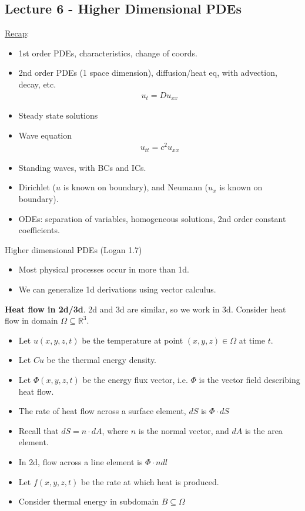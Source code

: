 \documentclass[12pt, letterpaper]{article}
\begin{document}
\subsection{Lecture 6 - Higher Dimensional PDEs}
\underline{Recap}:
\begin{itemize}
    \item 1st order PDEs, characteristics, change of coords.
    \item 2nd order PDEs (1 space dimension), diffusion/heat eq, with advection, decay, etc.
    \begin{align*}
        u_t = Du_{xx}
    \end{align*}
    \item Steady state solutions
    \item Wave equation
    \begin{align*}
        u_{tt} = c^2u_{xx}
    \end{align*}
    \item Standing waves, with BCs and ICs. 
    \item Dirichlet ($u$ is known on boundary), and Neumann ($u_x$ is known on boundary).
    \item ODEs: separation of variables, homogeneous solutions, 2nd order constant coefficients.
\end{itemize}
Higher dimensional PDEs (Logan 1.7) 
\begin{itemize}
    \item Most physical processes occur in more than 1d.
    \item We can generalize 1d derivations using vector calculus.
\end{itemize}
\textbf{Heat flow in 2d/3d}. 2d and 3d are similar, so we work in 3d. Consider heat flow in 
domain $\Omega \subseteq \mathbb{R}^3$. 
\begin{itemize}
    \item Let $u(x,y,z,t)$ be the temperature at point $(x,y,z) \in \Omega$ at time $t$. 
    \item Let $Cu$ be the thermal energy density.
    \item Let $\Phi(x,y,z,t)$ be the energy flux vector, i.e. $\Phi$ is the vector field describing 
    heat flow.
    \item The rate of heat flow across a surface element, $dS$ is $\Phi \cdot dS$ 
    \item Recall that $dS = n \cdot dA$, where $n$ is the normal vector, and $dA$ is the area element.
    \item In 2d, flow across a line element is $\Phi \cdot n dl$
    \item Let $f(x,y,z,t)$ be the rate at which heat is produced.
    \item Consider thermal energy in subdomain $B \subseteq \Omega$
\end{itemize}
\end{document}
